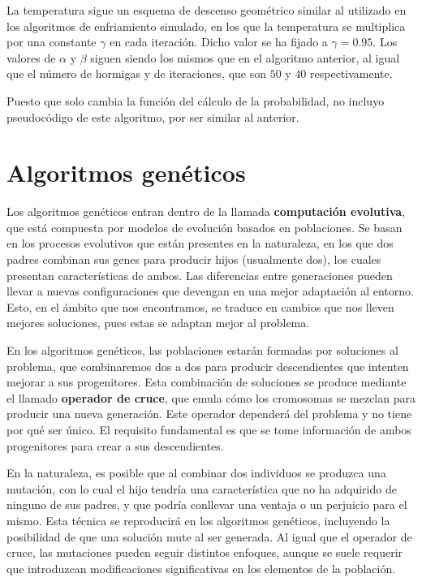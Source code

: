 La temperatura sigue un esquema de descenso geométrico similar al utilizado en los
algoritmos de enfriamiento simulado, en los que la temperatura se multiplica por
una constante $\gamma$ en cada iteración. Dicho valor se ha fijado a $\gamma = 0.95$.
Los valores de $\alpha$ y $\beta$ siguen siendo los mismos que en el algoritmo anterior,
al igual que el número de hormigas y de iteraciones, que son $50$ y $40$ respectivamente.

Puesto que solo cambia la función del cálculo de la probabilidad, no incluyo pseudocódigo
de este algoritmo, por ser similar al anterior.

\section{Algoritmos genéticos}

Los algoritmos genéticos entran dentro de la llamada \textbf{computación evolutiva},
que está compuesta por modelos de evolución basados en poblaciones. Se basan en
los procesos evolutivos que están presentes en la naturaleza, en los que dos padres
combinan sus genes para producir hijos (usualmente dos), los cuales presentan
características de ambos. Las diferencias entre generaciones pueden llevar a nuevas
configuraciones que devengan en una mejor adaptación al entorno. Esto, en el ámbito
que nos encontramos, se traduce en cambios que nos lleven mejores soluciones, pues
estas se adaptan mejor al problema.

En los algoritmos genéticos, las poblaciones estarán formadas por soluciones al
problema, que combinaremos dos a dos para producir descendientes que intenten mejorar
a sus progenitores. Esta combinación de soluciones se produce mediante el llamado
\textbf{operador de cruce}, que emula cómo los cromosomas se mezclan para producir
una nueva generación. Este operador dependerá del problema y no tiene por qué ser único.
El requisito fundamental es que se tome información de ambos progenitores para crear
a sus descendientes.

En la naturaleza, es posible que al combinar dos individuos se produzca una mutación,
con lo cual el hijo tendría una característica que no ha adquirido de ninguno de sus
padres, y que podría conllevar una ventaja o un perjuicio para el mismo. Esta técnica
se reproducirá en los algoritmos genéticos, incluyendo la posibilidad de que una
solución mute al ser generada. Al igual que el operador de cruce, las mutaciones
pueden seguir distintos enfoques, aunque se suele requerir que introduzcan modificaciones
significativas en los elementos de la población.

